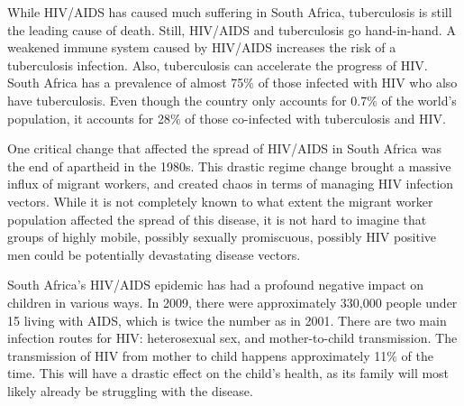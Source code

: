 \documentclass[12pt]{report}
\begin{document}
While HIV/AIDS has caused much suffering in South Africa, tuberculosis is still the leading cause of death.
Still, HIV/AIDS and tuberculosis go hand-in-hand.
A weakened immune system caused by HIV/AIDS increases the risk of a tuberculosis infection.
Also, tuberculosis can accelerate the progress of HIV.
South Africa has a prevalence of almost 75\% of those infected with HIV who also have tuberculosis.
Even though the country only accounts for 0.7\% of the world's population, it accounts for 28\% of those co-infected with tuberculosis and HIV.


One critical change that affected the spread of HIV/AIDS in South Africa was the end of apartheid in the 1980s\cite{wiki-apartheid}.
This drastic regime change brought a massive influx of migrant workers, and created chaos in terms of managing HIV infection vectors.
While it is not completely known to what extent the migrant worker population affected the spread of this disease, it is not hard to imagine that groups of highly mobile, possibly sexually promiscuous, possibly HIV positive men could be potentially devastating disease vectors\cite{migration}.


South Africa's HIV/AIDS epidemic has had a profound negative impact on children in various ways.  
In 2009, there were approximately 330,000 people under 15 living with AIDS, which is twice the number as in 2001.
There are two main infection routes for HIV: heterosexual sex, and mother-to-child transmission.  The transmission of HIV from mother to child happens approximately 11\% of the time.
This will have a drastic effect on the child's health, as its family will most likely already be struggling with the disease\cite{avert}.
\end{document}
